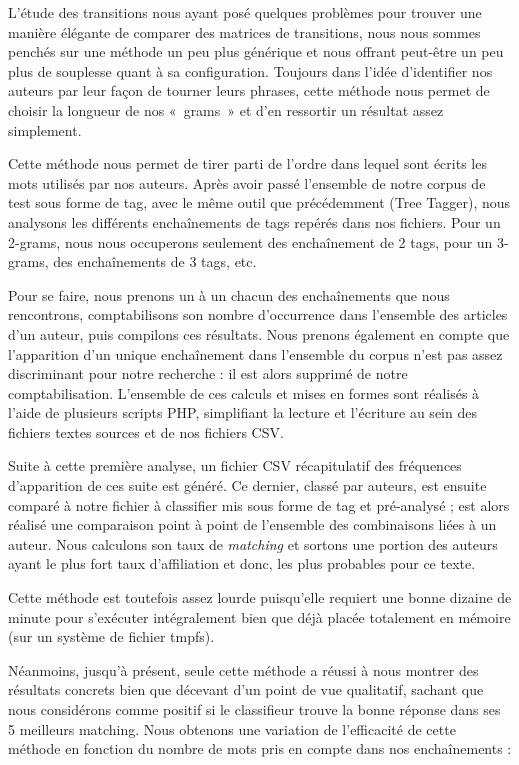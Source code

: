 \documentclass[a4paper,12pt]{report}
\begin{document}
L'étude des transitions nous ayant posé quelques problèmes pour trouver une manière élégante de comparer des matrices de transitions, nous nous sommes penchés sur une méthode un peu plus générique et nous offrant peut-être un peu plus de souplesse quant à sa configuration. Toujours dans l'idée d'identifier nos auteurs par leur façon de tourner leurs phrases, cette méthode nous permet de choisir la longueur de nos «~grams~» et d'en ressortir un résultat assez simplement.

Cette méthode nous permet de tirer parti de l'ordre dans lequel sont écrits les mots utilisés par nos auteurs. Après avoir passé l'ensemble de notre corpus de test sous forme de tag, avec le même outil que précédemment (Tree Tagger), nous analysons les différents enchaînements de tags repérés dans nos fichiers. Pour un 2-grams, nous nous occuperons seulement des enchaînement de 2 tags, pour un 3-grams, des enchaînements de 3 tags, etc.

Pour se faire, nous prenons un à un chacun des enchaînements que nous rencontrons, comptabilisons son nombre d'occurrence dans l'ensemble des articles d'un auteur, puis compilons ces résultats. Nous prenons également en compte que l'apparition d'un unique enchaînement dans l'ensemble du corpus n'est pas assez discriminant pour notre recherche : il est alors supprimé de notre comptabilisation. L'ensemble de ces calculs et mises en formes sont réalisés à l'aide de plusieurs scripts PHP, simplifiant la lecture et l'écriture au sein des fichiers textes sources et de nos fichiers CSV.

Suite à cette première analyse, un fichier CSV récapitulatif des fréquences d'apparition de ces suite est généré. Ce dernier, classé par auteurs, est ensuite comparé à notre fichier à classifier mis sous forme de tag et pré-analysé ; est alors réalisé une comparaison point à point de l'ensemble des combinaisons liées à un auteur. Nous calculons son taux de \textit{matching} et sortons une portion des auteurs ayant le plus fort taux d'affiliation et donc, les plus probables pour ce texte. 

Cette méthode est toutefois assez lourde puisqu'elle requiert une bonne dizaine de minute pour s'exécuter intégralement bien que déjà placée totalement en mémoire (sur un système de fichier tmpfs). 

Néanmoins, jusqu'à présent, seule cette méthode a réussi à nous montrer des résultats concrets bien que décevant d'un point de vue qualitatif, sachant que nous considérons comme positif si le classifieur trouve la bonne réponse dans ses 5 meilleurs matching. Nous obtenons une variation de l'efficacité de cette méthode en fonction du nombre de mots pris en compte dans nos enchaînements :
\end{document}
